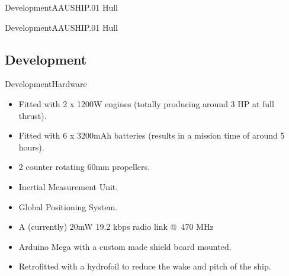 \documentclass[10pt,handout]{beamer}
\begin{document}
\begin{frame}{Development}{AAUSHIP.01 Hull}
\begin{figure}
	\begin{center}
		\label{fig:render}
	\end{center}
\end{figure}
\end{frame}

\begin{frame}{Development}{AAUSHIP.01 Hull}
\begin{figure}
	\begin{center}
		\label{fig:jumping}
	\end{center}
\end{figure}
\end{frame}

\subsection{Development}
\begin{frame}{Development}{Hardware}
\begin{itemize}
	\item Fitted with 2 x 1200W engines (totally producing around 3 HP at full thrust).
	\item Fitted with 6 x 3200mAh batteries (results in a mission time of around 5 hours).
	\item 2 counter rotating 60mm propellers.
	\item Inertial Measurement Unit.
	\item Global Positioning System.
	\item A (currently) 20mW 19.2 kbps radio link @ 470 MHz
	\item Arduino Mega with a custom made shield board mounted.
    \item Retrofitted with a hydrofoil to reduce the wake and pitch of the ship.
\end{itemize}
\end{frame}
\end{document}
